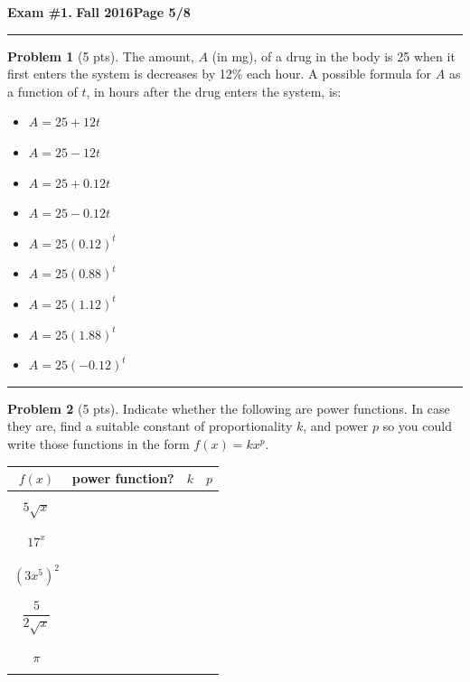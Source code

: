 \documentclass[12pt]{article}
\makeatletter
\theoremstyle{definition}
\newtheorem{problem}{Problem}
\newcommand*{\radiobutton}{%
  \@ifstar{\@radiobutton0}{\@radiobutton1}%
}
\newcommand*{\@radiobutton}[1]{%
  \begin{tikzpicture}
    \pgfmathsetlengthmacro\radius{height("X")/2}
    \draw[radius=\radius] circle;
    \ifcase#1 \fill[radius=.6*\radius] circle;\fi
  \end{tikzpicture}%
}
\makeatother
\begin{document}
\newpage

\hfill{\large\bf Exam \#1.}\hfill{\large\bf
  Fall 2016}\hfill{\large\bf Page 5/8}\hrule

\bigskip

\begin{problem}[5 pts]
The amount, $A$ (in mg), of a drug in the body is 25 when it first enters the system is decreases by 12\% each hour. A possible formula for $A$ as a function of $t$, in hours after the drug enters the system, is:
\begin{itemize}
\item[\radiobutton] $A= 25+12t$
\item[\radiobutton] $A=25-12t$
\item[\radiobutton] $A=25+0.12t$
\item[\radiobutton] $A=25-0.12t$
\item[\radiobutton] $A=25(0.12)^t$
\item[\radiobutton] $A=25(0.88)^t$
\item[\radiobutton] $A=25(1.12)^t$
\item[\radiobutton] $A=25(1.88)^t$
\item[\radiobutton] $A=25(-0.12)^t$
\end{itemize}
\end{problem}

\vspace{1cm}
\hrule

\begin{problem}[5 pts]
Indicate whether the following are power functions. In case they are, find a suitable constant of proportionality $k$, and power $p$ so you could write those functions in the form $f(x) = kx^p$.
\begin{center}
\begin{tabular}{|c|c|c|c|}
\hline
$f(x)$ & power function? & $k$ & $p$ \\
\hline
\hline
&&& \\
$5\sqrt{x}$ &&\hspace{1cm} & \hspace{1cm} \\
&&& \\
\hline
&&& \\
$17^x$ &&& \\
&&& \\
\hline
&&& \\
$(3x^5)^2$ &&& \\
&&& \\
\hline
&&& \\
$\dfrac{5}{2\sqrt{x}}$ &&& \\
&&& \\
\hline
&&& \\
$\pi$ &&& \\
&&& \\
\hline
\end{tabular}
\end{center}
\end{problem}
\newpage
\end{document}
